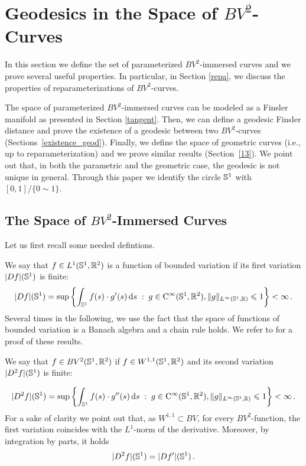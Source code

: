 
\section{Geodesics in the Space of $BV^2$-Curves}\label{BV2}

In this section we define  the set of parameterized $BV^2$-immersed curves and we prove several useful properties. In particular, in Section \ref{repa}, we discuss the properties of reparameterizations of $BV^2$-curves.

The space of parameterized $BV^2$-immersed curves can be  modeled as a Finsler manifold as presented in Section \ref{tangent}.  Then, we can define  a geodesic Finsler distance and prove the existence of a geodesic between two $BV^2$-curves  (Sections~\ref{existence_geod}). Finally, we define the space of geometric curves (i.e., up to reparameterization) and we prove similar results (Section~\ref{13}).
We point out that, in both the parametric and the geometric case,  the geodesic is not unique in general.
Through  this paper we identify the circle $\mathbb{S}^1$ with $[0,1] / \{0 \sim 1\}$.


\subsection{The Space of $BV^2$-Immersed Curves}
\label{11}
 
Let us first recall some needed defintions.
\begin{defn}[{\bf $BV^2$-functions}]
We say that $f\in L^1(\mathbb{S}^1,\mathbb{R}^2)$ is a function of bounded variation if its first variation $|D f|(\mathbb{S}^1)$ is finite:
$$	 |D f|(\mathbb{S}^1) = \sup \left\{ 
		\int_{\mathbb{S}^1}f(s)\cdot g'(s)\, \mathrm{d} s 
	 \;:\; 
		g\in \mathrm{C}^\infty(\mathbb{S}^1, {\mathbb R}^2),\|g\|_{L^\infty(\mathbb{S}^1,{\mathbb R})}\leqslant 1
	 \right\} <\infty\,.
$$
 Several times in the following, we use  the fact that the space of functions of bounded variation is a Banach algebra and a chain rule holds. We refer to \cite[Theorem 3.96, p. 189]{AFP} for a proof of these results.

We say that $f\in BV^2(\mathbb{S}^1,{\mathbb R}^2)$ if $f\in W^{1,1}(\mathbb{S}^1,{\mathbb R}^2)$ and its second variation $|D^2 f|(\mathbb{S}^1)$  is finite:

$$	 |D^2 f|(\mathbb{S}^1) = \sup \left\{ 
		\int_{\mathbb{S}^1}f(s)\cdot g''(s)\, \mathrm{d} s 
	 \;:\; 
		g\in \mathrm{C}^\infty(\mathbb{S}^1, {\mathbb R}^2),\|g\|_{L^\infty(\mathbb{S}^1,{\mathbb R})}\leqslant 1
	 \right\} <\infty\,.
$$
For a sake of clarity we point out that, as $W^{1,1}\subset BV$, for every $BV^2$-function, the  first variation  coincides  with the $L^1$-norm of the derivative. Moreover, by integration by parts, it holds
$$|D^2 f|(\mathbb{S}^1)=|D f'|(\mathbb{S}^1)\,.$$
\end{defn}


